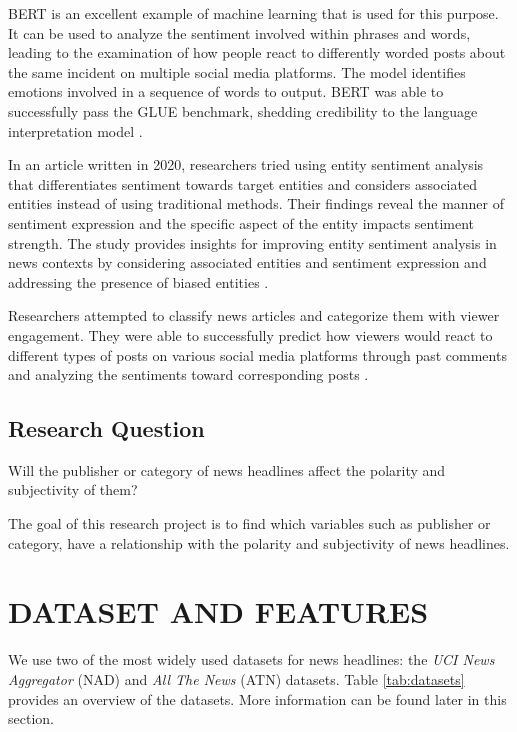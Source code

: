 \documentclass[12pt]{article}
\begin{document}
BERT is an excellent example of machine learning that is used for this purpose. It can be used to analyze the sentiment involved within phrases and words, leading to the examination of how people react to differently worded posts about the same incident on multiple social media platforms. The model identifies emotions involved in a sequence of words to output. BERT was able to successfully pass the GLUE benchmark, shedding credibility to the language interpretation model \cite{devlin2019}.

In an article written in 2020, researchers tried using entity sentiment analysis that differentiates sentiment towards target entities and considers associated entities instead of using traditional methods. Their findings reveal the manner of sentiment expression and the specific aspect of the entity impacts sentiment strength. The study provides insights for improving entity sentiment analysis in news contexts by considering associated entities and sentiment expression and addressing the presence of biased entities \cite{luo2020}.

Researchers attempted to classify news articles and categorize them with viewer engagement. They were able to successfully predict how viewers would react to different types of posts on various social media platforms through past comments and analyzing the sentiments toward corresponding posts \cite{aldous2022}.


\subsection{Research Question}

Will the publisher or category of news headlines affect the polarity and subjectivity of them?

The goal of this research project is to find which variables such as publisher or category, have a relationship with the polarity and subjectivity of news headlines. 

\section{DATASET AND FEATURES}

We use two of the most widely used datasets for news headlines: the \textit{UCI News Aggregator} (NAD) and \textit{All The News} (ATN) datasets. Table \ref{tab:datasets} provides an overview of the datasets. More information can be found later in this section.
\end{document}
